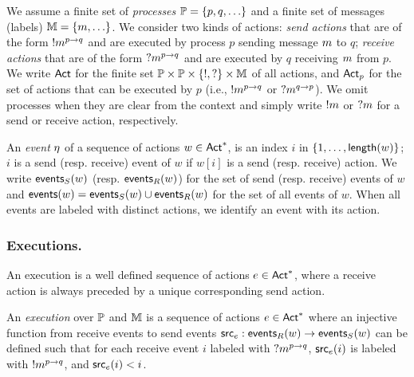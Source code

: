


We assume a finite set of \emph{processes} $\mathbb{P}=\{p,q,\ldots\}$ and a finite set of messages (labels) 
$\mathbb{M}=\{m,\ldots\}$.
We consider two kinds of actions:  \emph{send actions} that are  of the form 
$!m^{p\to q}$ and are executed by  process $p$  sending message  $m$ to  $q$;
 \emph{receive actions} that are of the form $?m^{p\to q}$ and are executed by  $q$ receiving  $m$ from  $p$.
We write $\mathsf{Act}$ for the finite set $\mathbb{P}\times\mathbb{P}\times\{!,?\}\times\mathbb{M}$ of all actions, and $\mathsf{Act}_{p}$ for the set of actions 
that can be executed by $p$ (i.e., $!m^{p\to q}$ or $?m^{q\to p}$). 
We omit processes when they are clear from the context and simply write $!m$ or $?m$ for a send or receive action, respectively.

An \emph{event} $\eta$ of a sequence of actions $w\in \mathsf{Act}^*$, is an index $i$ in $\{1,\ldots,\mathsf{length}(w)\}$;
$i$ is a send (resp. receive) event of $w$ if $w[i]$ is a send (resp. receive) action.
We write $\mathsf{events}_S(w)$ (resp. $\mathsf{events}_R(w)$) for the set of send (resp. receive) events 
of $w$ and $\mathsf{events}(w)=\mathsf{events}_S(w)\cup\mathsf{events}_R(w)$ for the set of all events of $w$.
When all events are labeled with distinct actions, we identify an event with its action.



\subsubsection*{Executions.}
An execution is a well defined sequence of actions $e\in\mathsf{Act}^*$, where 
a receive action is always preceded by a unique corresponding send action.


\begin{definition}[Execution]
	An \emph{execution} over $\mathbb{P}$ and $\mathbb{M}$ is a sequence of actions $e\in\mathsf{Act}^*$  
	where an injective function from receive events to send events $\mathsf{src}_{e}:\mathsf{events}_R(w)\to\mathsf{events}_S(w)$ 
	can be defined such that for each receive event $i$ labeled with $?m^{p\to q}$,
	 $\mathsf{src}_{e}(i)$ is labeled with $!m^{p\to q}$, and  $\mathsf{src}_{e}(i)<i$.
\end{definition}



